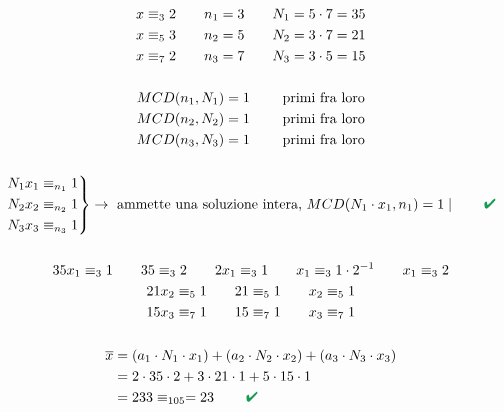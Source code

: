 \documentclass[italian]{article}
\renewcommand{\checkmark}{\textcolor{ForestGreen}{\text{$\qquad$\ding{52}}}}
\begin{document}
\begin{gather*}
	x \equiv_3 2 \qquad n_1 = 3 \qquad N_1 = 5\cdot 7 = 35\\
	x \equiv_5 3 \qquad n_2 = 5 \qquad N_2 = 3\cdot 7 = 21\\
	x \equiv_7 2 \qquad n_3 = 7 \qquad N_3 = 3\cdot 5 = 15\\\\
	MCD(n_1, N_1) = 1 \qquad \text{ primi fra loro}\\
	MCD(n_2, N_2) = 1 \qquad \text{ primi fra loro}\\
	MCD(n_3, N_3) = 1 \qquad \text{ primi fra loro}\\\\
	\begin{rcases*}
		N_1x_1 \equiv_{n_1} 1 \\
		N_2x_2 \equiv_{n_2} 1 \\
		N_3x_3 \equiv_{n_3} 1
	\end{rcases*}
	\to \text{ ammette una soluzione intera, } MCD(N_1\cdot x_1, n_1) = 1 \;|\; \checkmark\\\\
	35x_1 \equiv_3 1 \qquad 35\equiv_3 2 \qquad 2x_1 \equiv_3 1 \qquad x_1 \equiv_3 1\cdot2^{-1} \qquad x_1 \equiv_3 2\\
	21x_2 \equiv_5 1 \qquad 21 \equiv_5 1 \qquad x_2 \equiv_5 1\\
	15x_3 \equiv_7 1 \qquad 15 \equiv_7 1 \qquad x_3 \equiv_7 1\\\\
	\begin{split}
		\overline{x} &= (a_1\cdot N_1 \cdot x_1) + (a_2\cdot N_2 \cdot x_2) + (a_3\cdot N_3 \cdot x_3)\\
		&= 2\cdot 35 \cdot 2 + 3\cdot 21 \cdot 1 + 5\cdot 15 \cdot 1 \\
		&= 233 \equiv_{105} = 23 \;\checkmark
	\end{split}
\end{gather*}

\newpage
\end{document}
